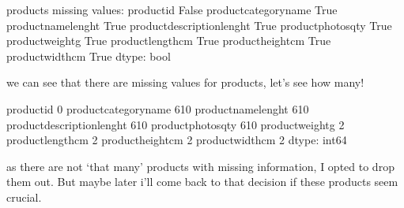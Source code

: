 \documentclass[letterpaper,10pt,english]{jupyterBook}
\begin{document}
\begin{sphinxVerbatim}[commandchars=\\\{\}]
products missing values: 
product\PYGZus{}id                    False
product\PYGZus{}category\PYGZus{}name          True
product\PYGZus{}name\PYGZus{}lenght            True
product\PYGZus{}description\PYGZus{}lenght     True
product\PYGZus{}photos\PYGZus{}qty             True
product\PYGZus{}weight\PYGZus{}g               True
product\PYGZus{}length\PYGZus{}cm              True
product\PYGZus{}height\PYGZus{}cm              True
product\PYGZus{}width\PYGZus{}cm               True
dtype: bool
\end{sphinxVerbatim}

\sphinxAtStartPar
we can see that there are missing values for products, let’s see how many!

\begin{sphinxVerbatim}[commandchars=\\\{\}]
\end{sphinxVerbatim}

\begin{sphinxVerbatim}[commandchars=\\\{\}]
product\PYGZus{}id                      0
product\PYGZus{}category\PYGZus{}name         610
product\PYGZus{}name\PYGZus{}lenght           610
product\PYGZus{}description\PYGZus{}lenght    610
product\PYGZus{}photos\PYGZus{}qty            610
product\PYGZus{}weight\PYGZus{}g                2
product\PYGZus{}length\PYGZus{}cm               2
product\PYGZus{}height\PYGZus{}cm               2
product\PYGZus{}width\PYGZus{}cm                2
dtype: int64
\end{sphinxVerbatim}

\sphinxAtStartPar
as there are not ‘that many’ products with missing information, I opted to drop them out. But maybe later i’ll come back to that decision if these products seem crucial.

\begin{sphinxVerbatim}[commandchars=\\\{\}]
  
\end{sphinxVerbatim}

\begin{sphinxVerbatim}[commandchars=\\\{\}]
\end{sphinxVerbatim}
\end{document}
